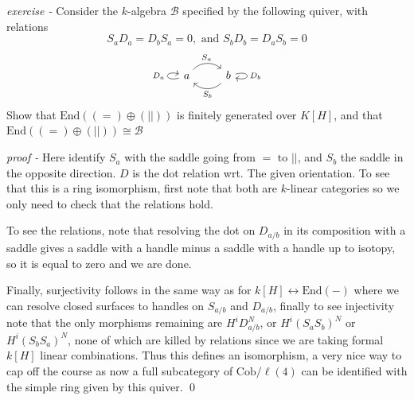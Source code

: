 \documentclass[11pt]{article}
\theoremstyle{definition}
\newcommand{\abs}[1]{\lvert#1\rvert}
\newcommand{\tand}{\text{ and }}
\begin{document}
    \emph{exercise - } Consider the \(k\)-algebra \(\mathcal{B}\) specified by the following quiver, with relations \[S_aD_a = D_bS_a = 0, \tand S_bD_b = D_aS_b = 0\]
    \begin{equation*}
        \begin{tikzcd}
            a \arrow[loop left, "{D_a}"] \arrow[r,bend right=315,"{S_a}"] & b\arrow[l,bend left=45,"{S_b}"] \arrow[loop right, "{D_b}"]
        \end{tikzcd}
    \end{equation*}
    Show that \(\text{End}((=) \oplus (\abs{}))\) is finitely generated over \(K[H]\), and that \(\text{End}((=) \oplus (\abs{})) \cong \mathcal{B}\)

    \emph{proof - } Here identify \(S_a\) with the saddle going from \(= \text{ to } \abs{}\), and \(S_b\) the saddle in the opposite direction. \(D\) is the dot relation wrt. The given orientation. To see that this is a ring isomorphism, first note that both are \(k\)-linear categories so we only need to check that the relations hold.

    To see the relations, note that resolving the dot on \(D_{a/b}\) in its composition with a saddle gives a saddle with a handle minus a saddle with a handle up to isotopy, so it is equal to zero and we are done.

    Finally, surjectivity follows in the same way as for \(k[H] \longleftrightarrow \text{End}(-)\) where we can resolve closed surfaces to handles on \(S_{a/b}\) and \(D_{a/b}\), finally to see injectivity note that the only morphisms remaining are \(H^iD_{a/b}^N\), or \(H^i(S_aS_b)^N\) or \(H^i(S_bS_a)^N\), none of which are killed by relations since we are taking formal \(k[H]\) linear combinations. Thus this defines an isomorphism, a very nice way to cap off the course as now a full subcategory of \(\text{Cob}/\ell(4)\) can be identified with the simple ring given by this quiver. \qed





    



    
\end{document}
